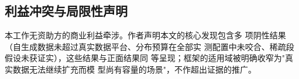 \subsection{利益冲突与局限性声明}
本工作无资助方的商业利益牵涉。作者声明本文的核心发现包含多
项阴性结果（自生成数据未超过真实数据平台、分布预算在全部实
测配置中未咬合、稀疏段假设未获证实），这些结果与正面结果同
等呈现；框架的适用域被明确收窄为"真实数据无法继续扩充而模
型尚有容量的场景"，不作超出证据的推广。
